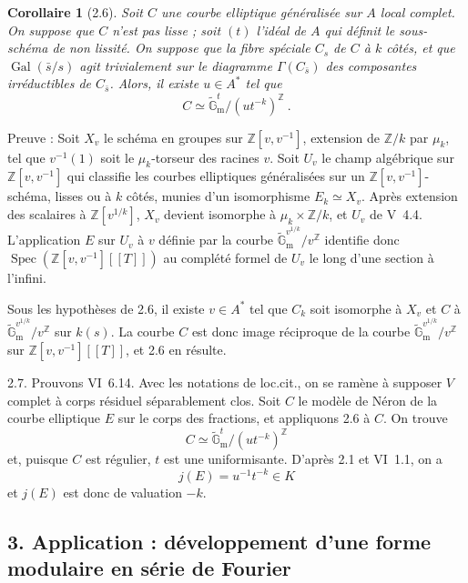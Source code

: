 \documentclass[12pt,a4paper]{amsart}
\theoremstyle{plain}
\newtheorem{corollaire}[proposition]{Corollaire}
\theoremstyle{definition}
\theoremstyle{remark}
\DeclareMathOperator{\Spec}{Spec}
\DeclareMathOperator{\Gal}{Gal}
\newcommand{\ZZ}{\mathbb{Z}}
\newcommand{\Gmtilde}{\widetilde{\mathbb{G}}_\mathrm{m}}
\begin{document}
\begin{corollaire}[2.6]
Soit $C$ une courbe elliptique g\'en\'eralis\'ee sur $A$ local complet. On suppose que $C$ n'est pas lisse ; soit $(t)$ l'id\'eal de $A$ qui d\'efinit le sous-sch\'ema de non lissit\'e. On suppose que la fibre sp\'eciale $C_s$ de $C$ \`a $k$ c\^ot\'es, et que $\Gal(\bar{s}/s)$ agit trivialement sur le diagramme $\Gamma(C_{\bar{s}})$ des composantes irr\'eductibles de $C_{\bar{s}}$. Alors, il existe $u \in A^*$ tel que
\[
C \simeq \Gmtilde^{t} / (ut^{-k})^{\ZZ} \ .
\]
\end{corollaire}

\noindent Preuve : Soit $X_v$ le sch\'ema en groupes sur $\ZZ[v, v^{-1}]$, extension de $\ZZ/k$ par $\mu_k$, tel que $v^{-1}(1)$ soit le $\mu_k$-torseur des racines $v$. Soit $U_v$ le champ alg\'ebrique sur $\ZZ[v, v^{-1}]$ qui classifie les courbes elliptiques g\'en\'eralis\'ees sur un $\ZZ[v, v^{-1}]$-sch\'ema, lisses ou \`a $k$ c\^ot\'es, munies d'un isomorphisme $E_k \simeq X_v$. Apr\`es extension des scalaires \`a $\ZZ[v^{1/k}]$, $X_v$ devient isomorphe \`a $\mu_k \times \ZZ/k$, et $U_v$ de V~4.4. L'application $E$ sur $U_v$ \`a $v$ d\'efinie par la courbe $\Gmtilde^{v^{1/k}} / v^{\ZZ}$ identifie donc $\Spec(\ZZ[v, v^{-1}][[T]])$ au compl\'et\'e formel de $U_v$ le long d'une section \`a l'infini.

Sous les hypoth\`eses de 2.6, il existe $v \in A^*$ tel que $C_k$ soit isomorphe \`a $X_v$ et $C$ \`a $\Gmtilde^{v^{1/k}} / v^{\ZZ}$ sur $k(s)$. La courbe $C$ est donc image r\'eciproque de la courbe $\Gmtilde^{v^{1/k}} / v^{\ZZ}$ sur $\ZZ[v, v^{-1}][[T]]$, et 2.6 en r\'esulte.

\medskip

2.7. Prouvons VI~6.14. Avec les notations de loc.cit., on se ram\`ene \`a supposer $V$ complet \`a corps r\'esiduel s\'eparablement clos. Soit $C$ le mod\`ele de N\'eron de la courbe elliptique $E$ sur le corps des fractions, et appliquons 2.6 \`a $C$. On trouve
\[
C \simeq \Gmtilde^{t} / (ut^{-k})^{\ZZ}
\]
et, puisque $C$ est r\'egulier, $t$ est une uniformisante. D'apr\`es 2.1 et VI~1.1, on a
\[
j(E) = u^{-1} t^{-k} \in K
\]
et $j(E)$ est donc de valuation $-k$.


\subsection*{3. Application : d\'eveloppement d'une forme modulaire en s\'erie de Fourier}
\end{document}
